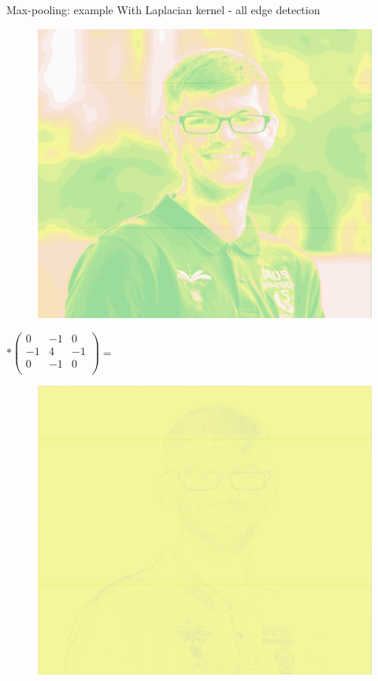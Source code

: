 \documentclass{beamer}
\begin{document}
\begin{frame}{Max-pooling: example}
With Laplacian kernel - all edge detection

\begin{minipage}{0.32\linewidth}
\begin{figure}
\includegraphics[width=\linewidth]{Images/conv15.png}
\end{figure}

\end{minipage}
\begin{minipage}{0.32\linewidth}
$ * \begin{pmatrix}
0 & -1 & 0 \\
-1 & 4 & -1\\
0& -1 & 0\\
\end{pmatrix} =$
\end{minipage}
\begin{minipage}{0.32\linewidth}
\begin{figure}
\includegraphics[width=\linewidth]{Images/conv16.png}
\end{figure}
\end{minipage}
\end{frame}
\end{document}
